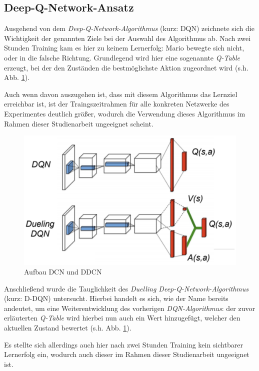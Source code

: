 \documentclass[sigconf,nonacm]{acmart}
\begin{document}
\subsection{Deep-Q-Network-Ansatz}
Ausgehend von dem \textit{Deep-Q-Network-Algorithmus} (kurz: DQN) zeichnete sich die Wichtigkeit der genannten Ziele bei der Auswahl des Algorithmus ab. Nach zwei Stunden Training kam es hier zu keinem Lernerfolg: Mario bewegte sich nicht, oder in die falsche Richtung. Grundlegend wird hier eine sogenannte \textit{Q-Table} erzeugt, bei der den Zuständen die bestmöglichste Aktion zugeordnet wird (s.h. Abb. \ref{fig:dcnddcn}). \cite{dqnmedium}

Auch wenn davon auszugehen ist, dass mit diesem Algorithmus das Lernziel erreichbar ist, ist der Traingszeitrahmen für alle konkreten Netzwerke des Experimentes deutlich größer, wodurch die Verwendung dieses Algorithmus im Rahmen dieser Studienarbeit ungeeignet scheint.

\begin{figure}[hbt!]
\includegraphics[width=\columnwidth]{dcn_and_ddcn.png}
\caption{Aufbau DCN und DDCN \cite{dcnddcn}}
\label{fig:dcnddcn}
\end{figure}

Anschließend wurde die Tauglichkeit des \textit{Duelling Deep-Q-Network-Algorithmus} (kurz: D-DQN) untersucht. Hierbei handelt es sich, wie der Name bereits andeutet, um eine Weiterentwicklung des vorherigen \textit{DQN-Algorithmus}: der zuvor erläuterten \textit{Q-Table} wird hierbei nun auch ein Wert hinzugefügt, welcher den aktuellen Zustand bewertet (s.h. Abb. \ref{fig:dcnddcn}). 

Es stellte sich allerdings auch hier nach zwei Stunden Training kein sichtbarer Lernerfolg ein, wodurch auch dieser im Rahmen dieser Studienarbeit ungeeignet ist.
\end{document}
